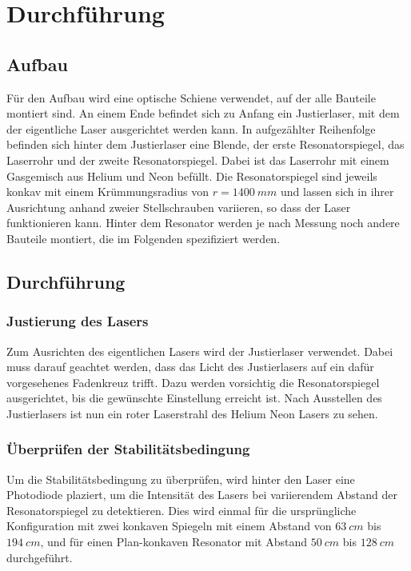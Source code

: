 \section{Durchführung}
\label{sec:Durchführung}

\subsection{Aufbau}

Für den Aufbau wird eine optische Schiene verwendet, auf der alle Bauteile montiert sind. An einem Ende befindet sich zu Anfang ein Justierlaser, mit dem der eigentliche Laser 
ausgerichtet werden kann. In aufgezählter Reihenfolge befinden sich hinter dem Justierlaser eine Blende, der erste Resonatorspiegel, das Laserrohr und der zweite Resonatorspiegel. 
Dabei ist das Laserrohr mit einem Gasgemisch aus Helium und Neon befüllt. Die Resonatorspiegel sind jeweils konkav mit einem Krümmungsradius von $r = \SI{1400}{mm} $ und lassen 
sich in ihrer Ausrichtung anhand zweier Stellschrauben variieren, so dass der Laser funktionieren kann. Hinter dem Resonator werden je nach Messung noch andere Bauteile montiert, 
die im Folgenden spezifiziert werden. 

\subsection{Durchführung}

\subsubsection{Justierung des Lasers}
Zum Ausrichten des eigentlichen Lasers wird der Justierlaser verwendet. Dabei muss darauf geachtet werden, dass das Licht des Justierlasers auf ein dafür vorgesehenes Fadenkreuz
trifft. Dazu werden vorsichtig die Resonatorspiegel ausgerichtet, bis die gewünschte Einstellung erreicht ist. Nach Ausstellen des Justierlasers ist nun ein roter Laserstrahl des 
Helium Neon Lasers zu sehen. 

\subsubsection{Überprüfen der Stabilitätsbedingung}
Um die Stabilitätsbedingung zu überprüfen, wird hinter den Laser eine Photodiode plaziert, um die Intensität des Lasers bei variierendem Abstand der Resonatorspiegel zu detektieren.
Dies wird einmal für die ursprüngliche Konfiguration mit zwei konkaven Spiegeln mit einem Abstand von $\SI{63}{cm} $ bis $\SI{194}{cm} $, und für einen Plan-konkaven Resonator mit 
Abstand $\SI{50}{cm} $ bis $\SI{128}{cm} $ durchgeführt. 

